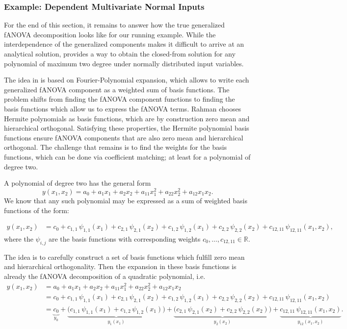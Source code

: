 \subsubsection{Example: Dependent Multivariate Normal Inputs}
For the end of this section, it remains to answer how the true generalized fANOVA decomposition looks like for our running example.
While the interdependence of the generalized components makes it difficult to arrive at an analytical solution, \cite{rahman2014} provides a way to obtain the closed-from solution for any polynomial of maximum two degree under normally distributed input variables.\par

The idea in \cite{rahman2014} is based on Fourier-Polynomial expansion, which allows to write each generalized fANOVA component as a weighted sum of basis functions. 
The problem shifts from finding the fANOVA component functions to finding the basis functions which allow us to express the fANOVA terms.
Rahman chooses Hermite polynomials as basis functions, which are by construction zero mean and hierarchical orthogonal. Satisfying these properties, the Hermite polynomial basis functions ensure fANOVA components that are also zero mean and hierarchical orthogonal.
The challenge that remains is to find the weights for the basis functions, which can be done via coefficient matching; at least for a polynomial of degree two.

A polynomial of degree two has the general form
$$y(x_1,x_2) = a_0 + a_1 x_1 + a_2 x_2 + a_{11} x_1^2 + a_{22} x_2^2 + a_{12} x_1 x_2.$$
We know that any such polynomial may be expressed as a sum of weighted basis functions \cite{nagler2024linalg} of the form:

\begin{align*}
y(x_1,x_2) 
&= c_0 
  + c_{1,1}\,\psi_{1,1}(x_1) 
  + c_{2,1}\,\psi_{2,1}(x_2)
  + c_{1,2}\,\psi_{1,2}(x_1)
  + c_{2,2}\,\psi_{2,2}(x_2)
  + c_{12, 11}\,\psi_{12, 11}(x_1,x_2),
\end{align*}
where the $\psi_{i,j}$ are the basis functions with corresponding weights $c_0, \dots , c_{12, 11} \in \mathbb{R}$.

The idea is to carefully construct a set of basis functions which fulfill zero mean 
and hierarchical orthogonality. Then the expansion in these basis functions is already the 
fANOVA decomposition of a quadratic polynomial, i.e.
\begin{align*}
y(x_1,x_2) 
&= a_0 + a_1 x_1 + a_2 x_2 + a_{11} x_1^2 + a_{22} x_2^2 + a_{12} x_1 x_2 \\[3pt]
&= c_0 
  + c_{1,1}\,\psi_{1,1}(x_1) 
  + c_{2,1}\,\psi_{2,1}(x_2)
  + c_{1,2}\,\psi_{1,2}(x_1)
  + c_{2,2}\,\psi_{2,2}(x_2)
  + c_{12, 11}\,\psi_{12, 11}(x_1,x_2) \\[3pt]
&= 
\underbrace{c_0}_{y_0}
+ \underbrace{\big(c_{1,1}\,\psi_{1,1}(x_1) 
                + c_{1,2}\,\psi_{1,2}(x_1)\big)}_{y_1(x_1)}
+ \underbrace{\big(c_{2,1}\,\psi_{2,1}(x_2) 
                + c_{2,2}\,\psi_{2,2}(x_2)\big)}_{y_2(x_2)}
+ \underbrace{c_{12, 11}\,\psi_{12, 11}(x_1,x_2)}_{y_{12}(x_1,x_2)}.
\end{align*}


